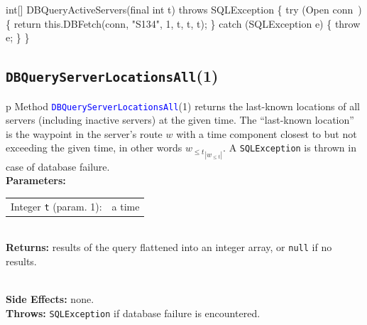 int[] DBQueryActiveServers(final int t) throws SQLException \{
  try (\LA{}Open \code{}conn\edoc{}~{\nwtagstyle{}}\RA{}) \{
    return this.DBFetch(conn, "S134", 1, t, t, t);
  \} catch (SQLException e) \{
    throw e;
  \}
\}
\eatline
{}\nwendcode{}\nwdocspar
\subsection{{\tt{}\protect{}DBQueryServerLocationsAll}(1)}
\begin{tabular}{p{\textwidth}}
\toprule
{}
Method \textcolor{blue}{{\tt{}\protect{}DBQueryServerLocationsAll}}(1) returns the
last-known locations of all servers (including inactive servers) at the given
time. The ``last-known location'' is the waypoint in the server's route $w$
with a time component closest to but not exceeding the given time, in other
words ${w_{\leq t}}_{|w_{\leq t}|}$.
A {\tt{}SQLException} is thrown in case of database failure.\\
\midrule
\textbf{Parameters:} \\
\begin{tabular}{lp{116mm}}
Integer {\tt{}t} (param. 1):&a time
\end{tabular}\\
\textbf{Returns:} results of the query flattened into an integer array, or
{\tt{}null} if no results.

\\
\textbf{Side Effects:} none.\\
\textbf{Throws:} {\tt{}SQLException} if database failure is encountered.\\
\bottomrule
\end{tabular}
